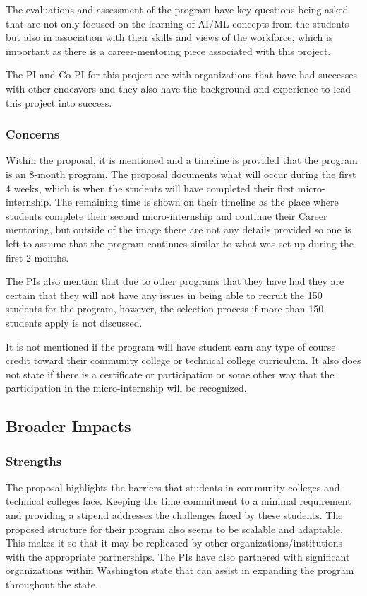 The evaluations and assessment of the program have key questions being asked that are not only focused on the learning of AI/ML concepts from the students but also in association with their skills and views of the workforce, which is important as there is a career-mentoring piece associated with this project. 

The PI and Co-PI for this project are with organizations that have had successes with other endeavors and they also have the background and experience to lead this project into success. 

\subsubsection{Concerns}

Within the proposal, it is mentioned and a timeline is provided that the program is an 8-month program. The proposal documents what will occur during the first 4 weeks, which is when the students will have completed their first micro-internship. The remaining time is shown on their timeline as the place where students complete their second micro-internship and continue their Career mentoring, but outside of the image there are not any details provided so one is left to assume that the program continues similar to what was set up during the first 2 months.

The PIs also mention that due to other programs that they have had they are certain that they will not have any issues in being able to recruit the 150 students for the program, however, the selection process if more than 150 students apply is not discussed. 

It is not mentioned if the program will have student earn any type of course credit toward their community college or technical college curriculum. It also does not state if there is a certificate or participation or some other way that the participation in the micro-internship will be recognized. 

\subsection{Broader Impacts}

\subsubsection{Strengths}

The proposal highlights the barriers that students in community colleges and technical colleges face. Keeping the time commitment to a minimal requirement and providing a stipend addresses the challenges faced by these students. The proposed structure for their program also seems to be scalable and adaptable. This makes it so that it may be replicated by other organizations/institutions with the appropriate partnerships. 
The PIs have also partnered with significant organizations within Washington state that can assist in expanding the program throughout the state. 

